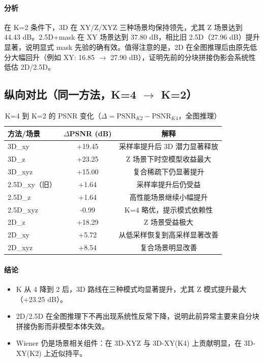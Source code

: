 \documentclass[UTF8, scheme=plain, 11pt, a4paper]{ctexart}
\newcommand{\psnr}{\text{PSNR}}
\begin{document}
\paragraph{分析}
在 K=2 条件下，3D 在 XY/Z/XYZ 三种场景均保持领先，尤其 Z 场景达到 44.43 dB。2.5D+mask 在 XY 场景达到 37.80 dB，相比旧 2.5D（27.96 dB）提升显著，说明显式 mask 先验的确有效。值得注意的是，2D 在全图推理后由原先低分大幅回升（例如 XY: 16.85 $\rightarrow$ 27.90 dB），证明先前的分块拼接伪影会系统性低估 2D/2.5D。

\subsection{纵向对比（同一方法，K=4 $\rightarrow$ K=2）}

\begin{table}[H]
  \centering
  \caption{K=4 到 K=2 的 PSNR 变化（$\Delta = \psnr_{K2} - \psnr_{K4}$，全图推理）}
  \begin{tabular}{lcc}
    \toprule
    方法/场景 & $\Delta$PSNR (dB) & 解释 \\
    \midrule
    3D\_xy & +19.45 & 采样率提升后 3D 潜力显著释放 \\
    3D\_z & +23.25 & Z 场景下时空模型收益最大 \\
    3D\_xyz & +15.00 & 复合稀疏下仍显著提升 \\
    2.5D\_xy（旧） & +1.64 & 采样率提升后仍受益 \\
    2.5D\_z & +1.64 & 高性能场景继续小幅提升 \\
    2.5D\_xyz & -0.99 & K=4 略优，提示模式依赖性 \\
    2D\_z & +18.29 & Z 场景受益极大 \\
    2D\_xy & +5.72 & 从低采样恢复到高采样显著改善 \\
    2D\_xyz & +8.54 & 复合场景明显改善 \\
    \bottomrule
  \end{tabular}
\end{table}

\paragraph{结论}
\begin{itemize}
  \item K 从 4 降到 2 后，3D 路线在三种模式均显著提升，尤其 Z 模式提升最大（+23.25 dB）。
  \item 2D/2.5D 在全图推理下不再出现系统性反常下降，说明此前异常主要来自分块拼接伪影而非模型本体失效。
  \item Wiener 仍是场景相关组件：在 3D-XYZ 与 3D-XY(K4) 上贡献明显，在 3D-XY(K2) 上近似持平。
\end{itemize}
\end{document}
